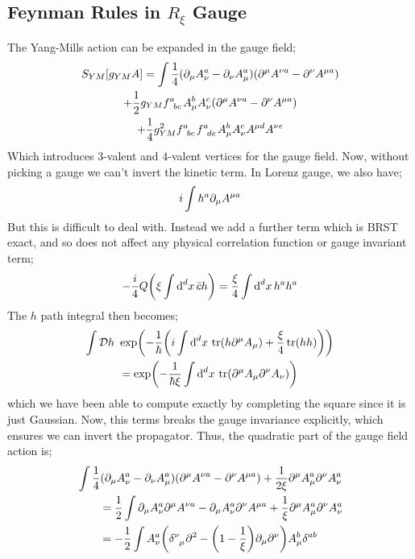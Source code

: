 \subsection{Feynman Rules in $R_{\xi}$ Gauge}
The Yang-Mills action can be expanded in the gauge field;
\begin{multline}
S_{YM}[g_{YM}A] = \int{}\frac{1}{4}(\del_\mu A_\nu^a - \del_\nu A_\mu^a)(\del^\mu A^{\nu a} - \del^\nu A^{\mu a}) \\ + \frac{1}{2}g_{YM}f\indices{^{a}_{bc}}A_\mu^b A_\nu^c (\del^\mu A^{\nu a} - \del^\nu A^{\mu a}) \\ + \frac{1}{4}g_{YM}^2 f\indices{^{a}_{bc}}f\indices{^{a}_{de}}A_\mu^b A_\nu^c A^{\mu d} A^{\nu e}
\end{multline}
Which introduces $3$-valent and $4$-valent vertices for the gauge field. Now, without picking a gauge we can't invert the kinetic term. In Lorenz gauge, we also have;
\begin{equation*}
i\int{h^a \partial_\mu A^{\mu a}}
\end{equation*}
But this is difficult to deal with. Instead we add a further term which is BRST exact, and so does not affect any physical correlation function or gauge invariant term;
\begin{equation*}
-\frac{i}{4}Q\left(\xi \int{\upd{^d x}\bar{c}h}\right) = \frac{\xi}{4}\int{\upd{^d x}h^a h^a}
\end{equation*}
The $h$ path integral then becomes;
\begin{multline*}
\int{\mD h\,\,\exp\left(-\frac{1}{\hbar}\left(i\int{\upd{^d x}\tr(h \del^\mu A_\mu) + \frac{\xi}{4}\tr(hh)}\right)\right)} \\ = \exp\left(-\frac{1}{\hbar \xi} \int{\upd{^d x}\tr(\del^\mu A_\mu \del^\nu A_\nu)}\right)
\end{multline*}
which we have been able to compute exactly by completing the square since it is just Gaussian. Now, this terms breaks the gauge invariance explicitly, which ensures we can invert the propagator. Thus, the quadratic part of the gauge field action is;
\begin{align*}
&\int{\frac{1}{4}(\del_\mu A_\nu^a - \del_\nu A_\mu^a)(\del^\mu A^{\nu a} - \del^\nu A^{\mu a}) + \frac{1}{2\xi}\del^\mu A_\mu^a \del^\nu A_\nu^a} \\
&\qquad = \frac{1}{2}\int{\del_\mu A_\nu^a \del^\mu A^{\nu a} - \del_\mu A_\nu^a \del^\nu A^{\mu a} + \frac{1}{\xi}\del^\mu A_\mu^a \del^\nu A_\nu^a} \\
&\qquad = -\frac{1}{2}\int{A_\nu^a \left(\delta\indices{^{\nu}_{\mu}}\del^2 - \left(1 - \frac{1}{\xi}\right)\del_\mu \del^\nu\right)A_\mu^b \delta^{ab}}
\end{align*}

